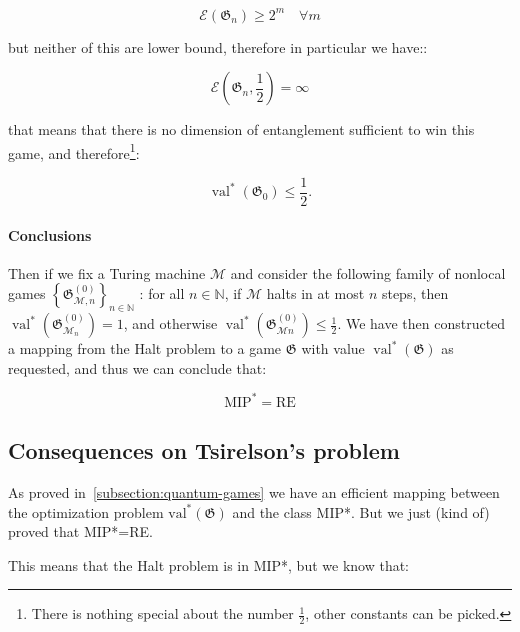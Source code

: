 \begin{equation}
    \mathscr{E}\left(\mathfrak{G}_{n}\right) \geq 2^m \quad \forall m
\end{equation}

but neither of this are lower bound, therefore in particular we have::

\begin{equation}
    \mathscr{E}\left(\mathfrak{G}_{n}, \frac{1}{2}\right) = \infty
\end{equation}

that means that there is no dimension of entanglement sufficient to win this game, and therefore\footnote{There is nothing special about the number $\frac{1}{2}$, other constants can be picked.}:

\begin{equation}
    \operatorname{val}^{*}(\mathfrak{G}_0) \leq \frac{1}{2}.
\end{equation}
\paragraph{Conclusions}
Then if we fix a Turing machine $\mathcal{M}$ and consider the following family of nonlocal games $\left\{\mathfrak{G}_{\mathcal{M}, n}^{(0)}\right\}_{n \in \mathbb{N}}$ : for all $n \in \mathbb{N}$, if $\mathcal{M}$ halts in at most $n$ steps, then $\operatorname{val}^{*}\left(\mathfrak{G}_{\mathcal{M}_{n}}^{(0)}\right)=1$, and otherwise $\operatorname{val}^{*}\left(\mathfrak{G}_{\mathcal{M} n}^{(0)}\right) \leq \frac{1}{2}$.
We have then constructed a mapping from the Halt problem to a game $\mathfrak{G}$ with value $\operatorname{val}^{*}(\mathfrak{G})$ as requested, and thus we can conclude that:
\begin{theorem}
\begin{equation}
\text{MIP}^{*} = \text{RE}
\end{equation}
\end{theorem}

\subsection{Consequences on Tsirelson's problem}
As proved in~\ref{subsection:quantum-games} we have an efficient mapping between the optimization problem $\operatorname{val^{*}}(\mathfrak{G})$ and the class MIP*. But we just (kind of) proved that MIP*=RE.

This means that the Halt problem is in MIP*, but we know that:

